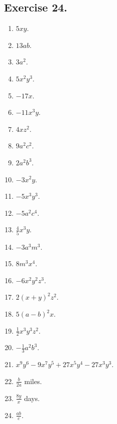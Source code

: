 \documentclass{book}
\begin{document}
\subsection*{Exercise 24.} \begin{enumerate}

\item $5xy$.

\item $13ab$.

\item $3a^2$.

\item $5x^2 y^3$.

\item $-17x$.

\item $-11x^3 y$.

\item $4xz^2$.

\item $9a^2c^2$.

\item $2a^2 b^3$.

\item $-3x^2y$.

\item $-5x^3 y^3$.

\item $-5a^2 c^4$.

\item $\frac{4}{5} x^3y$.

\item $-3a^3 m^3$.

\item $8m^3 x^4$.

\item $-6x^2 y^2 z^3$.

\item $2(x + y)^2 z^2$.

\item $5(a - b)^2 x$.

\item $\frac{1}{2} x^3 y^3 z^2$.

\item $-\frac{1}{3} a^2 b^3$.

\item $x^9 y^6 - 9x^7 y^5 + 27x^5 y^4 - 27 x^3 y^3$.

\item $\frac{b}{2a}$ miles.

\item $\frac{8y}{x}$ days.

\item $\frac{ab}{c}$.
\end{enumerate}
\end{document}
